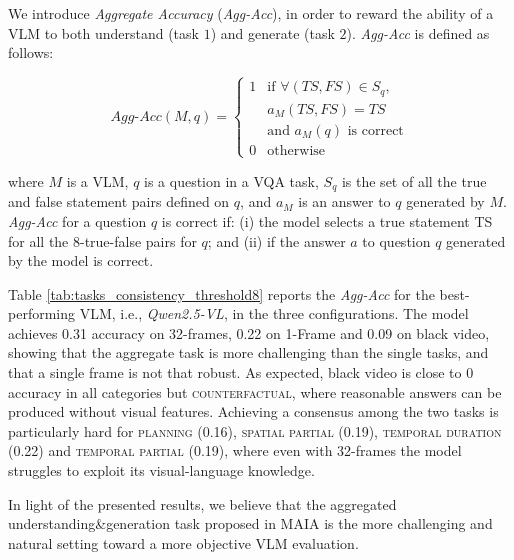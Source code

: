 We  introduce \textit{Aggregate Accuracy} (\textit{Agg-Acc}), in order to reward the ability of a VLM to both understand (task $1$) and generate (task $2$). \textit{Agg-Acc} is defined as follows:

\begin{comment}
\[
Agg\text{-}Acc(M, q) = 
\begin{cases} 
1 &  \, \text{for all }  TS-FS a_M = \text{$TS$}  \\
  &  and \,  a_M  = \text{ correct} \\
0 & \text{otherwise}
\end{cases}
\]
\end{comment}

\[
Agg\text{-}Acc(M, q) = 
\begin{cases} 
1 & \text{if } \forall (TS, FS) \in S_q, \\
  & a_M(TS, FS) = TS \\
  & \text{and } a_M(q) \text{ is correct} \\
0 & \text{otherwise}
\end{cases}
\]


\noindent
where $M$ is a VLM, $q$ is a question in a VQA task, $S_q$ is the set of all the true and false statement pairs defined on $q$, and $a_M$ is an answer to $q$ generated by $M$.
\textit{Agg-Acc} for a question $q$ is correct if: (i) the model selects a true statement TS for all the 8-true-false pairs for $q$; and (ii) if the answer $a$ to question $q$ generated by the model is correct. 

Table \ref{tab:tasks_consistency_threshold8} reports the \textit{Agg-Acc} for the best-performing VLM, i.e., \textit{Qwen2.5-VL}, in the three configurations. The model achieves 0.31 accuracy on  32-frames, 0.22 on 1-Frame and 0.09 on black video, showing that the aggregate task is more challenging than the single tasks, and that a single frame is not that robust. As expected, black video is close to 0 accuracy in all categories but  \textsc{counterfactual}, where reasonable answers can be produced without visual features. Achieving a consensus among the two tasks is particularly hard for \textsc{planning} (0.16), \textsc{spatial partial} (0.19), \textsc{temporal duration} (0.22) and \textsc{temporal partial} (0.19), where even with 32-frames the model struggles to exploit its visual-language knowledge.

In light of the presented results, we believe that the aggregated understanding\&generation task proposed in MAIA is the more challenging and natural setting toward a more objective VLM evaluation.







